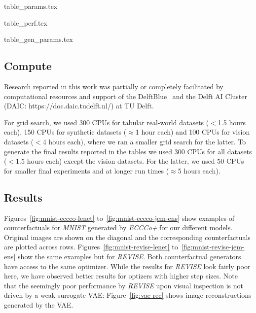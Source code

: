 {table_params.tex}

{table_perf.tex}

{table_gen_params.tex}

\subsection{Compute}

Research reported in this work was partially or completely facilitated by computational resources and support of the DelftBlue~\citep{DHPC2022} and the Delft AI Cluster (DAIC: https://doc.daic.tudelft.nl/) at TU Delft. 

For grid search, we used 300 CPUs for tabular real-world datasets ($<$1.5 hours each), 150 CPUs for synthetic datasets ($\approx$1 hour each) and 100 CPUs for vision datasets ($<$4 hours each), where we ran a smaller grid search for the latter. To generate the final results reported in the tables we used 300 CPUs for all datasets ($<$1.5 hours each) except the vision datasets. For the latter, we used 50 CPUs for smaller final experiments and at longer run times ($\approx$5 hours each).

\subsection{Results}\label{app:results}

Figures~\ref{fig:mnist-eccco-lenet} to~\ref{fig:mnist-eccco-jem-ens} show examples of counterfactuals for \textit{MNIST} generated by \textit{ECCCo+} for our different models. Original images are shown on the diagonal and the corresponding counterfactuals are plotted across rows. Figures~\ref{fig:mnist-revise-lenet} to~\ref{fig:mnist-revise-jem-ens} show the same examples but for \textit{REVISE}. Both counterfactual generators have access to the same optimizer. While the results for \textit{REVISE} look fairly poor here, we have observed better results for optizers with higher step sizes. Note that the seemingly poor performance by \textit{REVISE} upon visual inspection is not driven by a weak surrogate VAE: Figure~\ref{fig:vae-rec} shows image reconstructions generated by the VAE.



